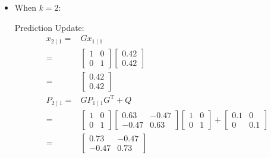 \documentclass[twoside]{article}
\renewcommand{\t}{^\mathrm{T}{}}
\begin{document}
\begin{itemize}
\begin{align*}
\begin{array}{c}
	\end{array}\right]\\
	P_{1\mid 1} =& P_{1\mid 0} - K_1 S_{1\mid 0}K_1\t\\
	 =& \left[ \begin{array}{cc}
	 	1.1 & 0 \\ 0 & 1.1
	 \end{array}\right]-2.5\left[ \begin{array}{c}
	 0.42 \\ 0.42
	 \end{array}\right]\left[ \begin{array}{cc}
	 0.42 & 0.42
	\end{array}\right]\\
	=&	\left[ \begin{array}{cc}
		0.63 & -0.47 \\ -0.47 & 0.63
	\end{array}\right]
	\end{align*}
\item When $k = 2$:

Prediction Update:
\begin{align*}
	x_{2\mid 1} =& G x_{1\mid 1}\\
	=& \left[ \begin{array}{cc}
		1 & 0 \\ 0 & 1
	\end{array}\right] \left[ \begin{array}{c}
		0.42 \\ 0.42
	\end{array}\right] \\
	=&\left[ \begin{array}{c}
		0.42 \\ 0.42
	\end{array}\right] \\
	P_{2\mid 1} =& G P_{1\mid 1} G\t + Q\\
	=& \left[ \begin{array}{cc}
		1 & 0 \\ 0 & 1
	\end{array}\right]\left[ \begin{array}{cc}
		0.63 & -0.47 \\ -0.47 & 0.63
	\end{array}\right]\left[ \begin{array}{cc}
		1 & 0 \\ 0 & 1
	\end{array}\right]+\left[ \begin{array}{cc}
		0.1 & 0 \\ 0 & 0.1
	\end{array}\right]\\
	=& \left[ \begin{array}{cc}
		0.73 & -0.47 \\ -0.47 & 0.73
	\end{array}\right]
\end{align*}


\end{itemize}
\end{document}
